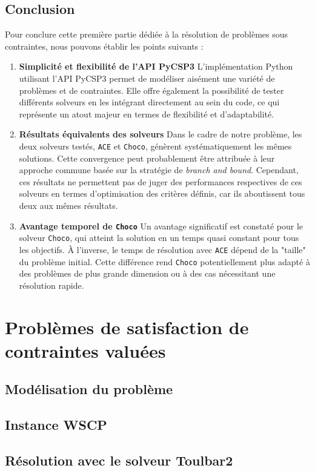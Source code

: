 \documentclass[12pt]{article}
\begin{document}
\subsection{Conclusion}

Pour conclure cette première partie dédiée à la résolution de problèmes sous contraintes, nous pouvons établir les points suivants :  
\begin{enumerate}
    \item \textbf{Simplicité et flexibilité de l’API PyCSP3}  
    L'implémentation Python utilisant l'API PyCSP3 permet de modéliser aisément une variété de problèmes et de contraintes. Elle offre 
    également la possibilité de tester différents solveurs en les intégrant directement au sein du code, ce qui représente un atout majeur 
    en termes de flexibilité et d'adaptabilité.
    
    \item \textbf{Résultats équivalents des solveurs}  
    Dans le cadre de notre problème, les deux solveurs testés, \texttt{ACE} et \texttt{Choco}, génèrent systématiquement 
    les mêmes solutions. Cette convergence peut probablement être attribuée à leur approche commune basée sur la stratégie 
    de \textit{branch and bound}. Cependant, ces résultats ne permettent pas de juger des performances respectives de ces 
    solveurs en termes d'optimisation des critères définis, car ils aboutissent tous deux aux mêmes résultats.

    \item \textbf{Avantage temporel de \texttt{Choco}}  
    Un avantage significatif est constaté pour le solveur \texttt{Choco}, qui atteint la solution en un temps quasi constant pour tous les 
    objectifs. À l'inverse, le temps de résolution avec \texttt{ACE} dépend de la "taille" du problème initial. Cette différence rend \texttt{Choco} 
    potentiellement plus adapté à des problèmes de plus grande dimension ou à des cas nécessitant une résolution rapide.
\end{enumerate}

\section{Problèmes de satisfaction de contraintes valuées}
\subsection{Modélisation du problème }
\subsection{Instance WSCP}
\subsection{Résolution avec le solveur Toulbar2}
\end{document}
